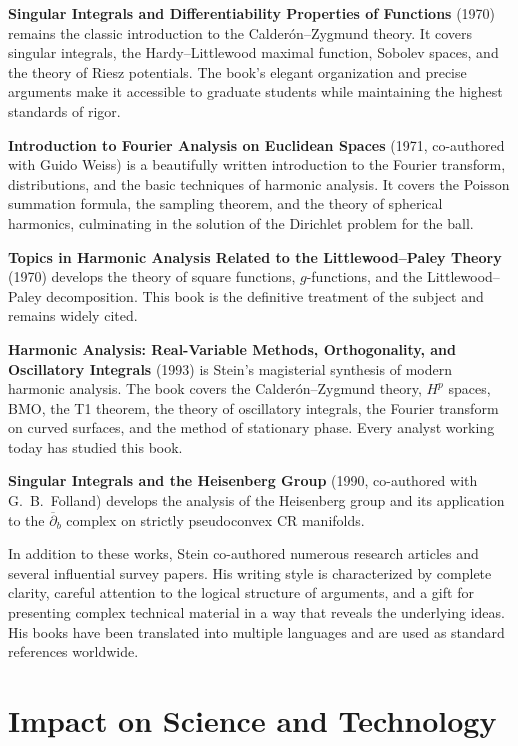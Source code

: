 \textbf{Singular Integrals and Differentiability Properties of Functions} (1970) remains the classic introduction to the Calder\'on--Zygmund theory. It covers singular integrals, the Hardy--Littlewood maximal function, Sobolev spaces, and the theory of Riesz potentials. The book's elegant organization and precise arguments make it accessible to graduate students while maintaining the highest standards of rigor.

\textbf{Introduction to Fourier Analysis on Euclidean Spaces} (1971, co-authored with Guido Weiss) is a beautifully written introduction to the Fourier transform, distributions, and the basic techniques of harmonic analysis. It covers the Poisson summation formula, the sampling theorem, and the theory of spherical harmonics, culminating in the solution of the Dirichlet problem for the ball.

\textbf{Topics in Harmonic Analysis Related to the Littlewood--Paley Theory} (1970) develops the theory of square functions, \(g\)-functions, and the Littlewood--Paley decomposition. This book is the definitive treatment of the subject and remains widely cited.

\textbf{Harmonic Analysis: Real-Variable Methods, Orthogonality, and Oscillatory Integrals} (1993) is Stein's magisterial synthesis of modern harmonic analysis. The book covers the Calder\'on--Zygmund theory, \(H^p\) spaces, BMO, the T1 theorem, the theory of oscillatory integrals, the Fourier transform on curved surfaces, and the method of stationary phase. Every analyst working today has studied this book.

\textbf{Singular Integrals and the Heisenberg Group} (1990, co-authored with G.\ B.\ Folland) develops the analysis of the Heisenberg group and its application to the \(\overline{\partial}_b\) complex on strictly pseudoconvex CR manifolds.

In addition to these works, Stein co-authored numerous research articles and several influential survey papers. His writing style is characterized by complete clarity, careful attention to the logical structure of arguments, and a gift for presenting complex technical material in a way that reveals the underlying ideas. His books have been translated into multiple languages and are used as standard references worldwide.

\section{Impact on Science and Technology}

